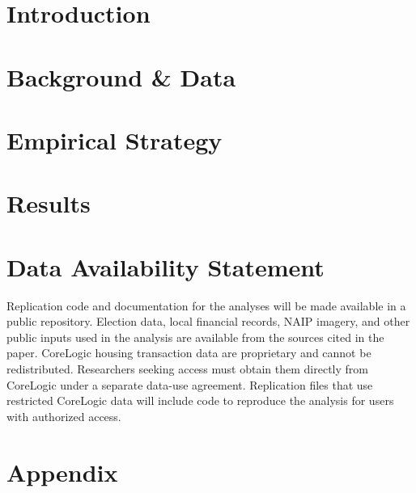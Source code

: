 ﻿\documentclass[12pt]{article}
\begin{document}
\section{Introduction} \label{sec:introduction}







\section{Background \& Data} \label{sec:data}



\section{Empirical Strategy} \label{sec:empirical}



\section{Results} \label{sec:result}



\section*{Data Availability Statement}
Replication code and documentation for the analyses will be made available in a public repository. Election data, local financial records, NAIP imagery, and other public inputs used in the analysis are available from the sources cited in the paper. CoreLogic housing transaction data are proprietary and cannot be redistributed. Researchers seeking access must obtain them directly from CoreLogic under a separate data-use agreement. Replication files that use restricted CoreLogic data will include code to reproduce the analysis for users with authorized access.





\singlespacing
\setlength\bibsep{6pt}





\clearpage

\appendix
\section*{Appendix} \label{sec:appendix}




\clearpage




















\clearpage
\end{document}
